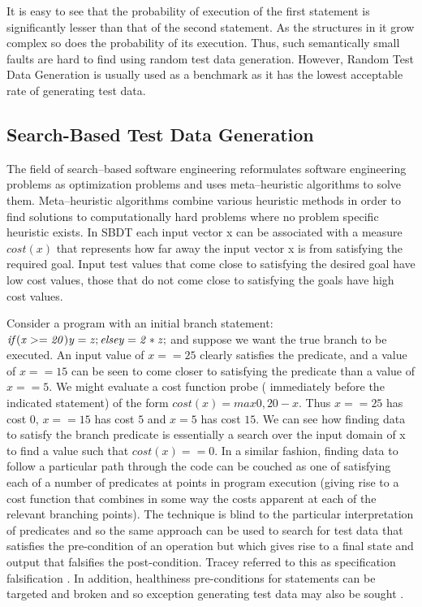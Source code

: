 It is easy to see that the probability of execution of the first statement is significantly lesser than that of the second statement. As the structures in it grow complex so does the probability of its execution. Thus, such semantically small faults are hard to find using random test data generation. However, Random Test Data Generation is usually used as a benchmark as it has the lowest acceptable rate of generating test data.

\subsection{Search-Based Test Data Generation}
The field of search–based software engineering reformulates software engineering problems as optimization problems and uses meta–heuristic algorithms to solve them. Meta–heuristic algorithms combine various heuristic methods in order to find solutions to computationally hard problems where no problem specific heuristic exists. In SBDT each input vector x can be associated with a measure $cost(x)$ that represents how far away the input vector x is from satisfying the required goal. Input test values that come close to satisfying the desired goal have low cost values, those that do not come close to satisfying the goals have high cost values. 

Consider a program with an initial branch statement: ${\it{ if (x >= 20) y = z; else y = 2 * z;}}$ and suppose we want the true branch to be executed. An input value of $x == 25$ clearly satisfies the predicate, and a value of $x == 15$ can be seen to come closer to satisfying the predicate than a value of $x ==5$. We might evaluate a cost function probe ( immediately before the indicated statement) of the form $cost(x) = max {0, 20 - x}$. Thus $x == 25$ has cost $0$, $x == 15$ has cost $5$ and $x = 5$ has cost $15$. We can see how finding data to satisfy the branch predicate is essentially a search over the input domain of x to find a value such that $cost(x) == 0$. In a similar fashion, finding data to follow a particular path through the code can be couched as one of satisfying each of a number of predicates at points in program execution (giving rise to a cost function that combines in some way the costs apparent at each of the relevant branching points).  The technique is blind to the particular interpretation of predicates and so the same approach can be used to search for test data that satisfies the pre-condition of an operation but which gives rise to a final state and output that falsifies the post-condition. Tracey referred to this as specification falsification \cite{tracey1998automated}. In addition, healthiness pre-conditions for statements can be targeted and broken and so exception generating test data may also be sought \cite{tracey2000automated}. 

